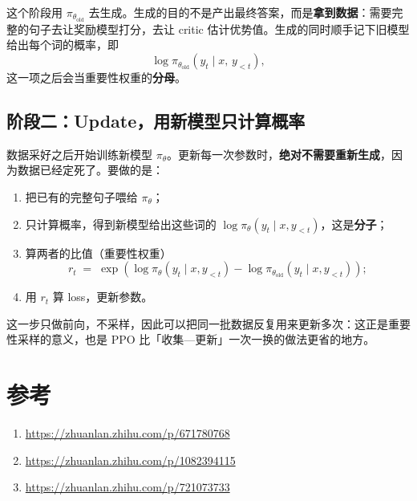 \documentclass[UTF8,fontset=fandol]{ctexart}
\begin{document}
这个阶段用 $\pi_{\theta_{\text{old}}}$ 去生成。生成的目的不是产出最终答案，而是\textbf{拿到数据}：需要完整的句子去让奖励模型打分，去让 critic 估计优势值。生成的同时顺手记下旧模型给出每个词的概率，即
\[
\log \pi_{\theta_{\text{old}}}(y_t \mid x,\, y_{<t}),
\]
这一项之后会当重要性权重的\textbf{分母}。

\subsection{阶段二：Update，用新模型只计算概率}

数据采好之后开始训练新模型 $\pi_\theta$。更新每一次参数时，\textbf{绝对不需要重新生成}，因为数据已经定死了。要做的是：

\begin{enumerate}
  \item 把已有的完整句子喂给 $\pi_\theta$；
  \item 只计算概率，得到新模型给出这些词的
  $\log \pi_\theta(y_t \mid x, y_{<t})$，这是\textbf{分子}；
  \item 算两者的比值（重要性权重）
  \[
  r_t \;=\; \exp\!\left(\log \pi_\theta(y_t \mid x, y_{<t}) - \log \pi_{\theta_{\text{old}}}(y_t \mid x, y_{<t})\right);
  \]
  \item 用 $r_t$ 算 loss，更新参数。
\end{enumerate}

这一步只做前向，不采样，因此可以把同一批数据反复用来更新多次：这正是重要性采样的意义，也是 PPO 比「收集—更新」一次一换的做法更省的地方。

\section{参考}

\begin{enumerate}
\item \url{https://zhuanlan.zhihu.com/p/671780768}
\item \url{https://zhuanlan.zhihu.com/p/1082394115}
\item \url{https://zhuanlan.zhihu.com/p/721073733}
\end{enumerate}
\end{document}
